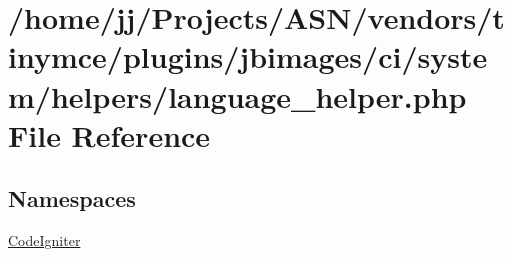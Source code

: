 \hypertarget{language__helper_8php}{}\section{/home/jj/\+Projects/\+A\+S\+N/vendors/tinymce/plugins/jbimages/ci/system/helpers/language\+\_\+helper.php File Reference}
\label{language__helper_8php}
\subsection*{Namespaces}
\begin{DoxyCompactItemize}
\item 
 \hyperlink{namespace_code_igniter}{Code\+Igniter}
\end{DoxyCompactItemize}
